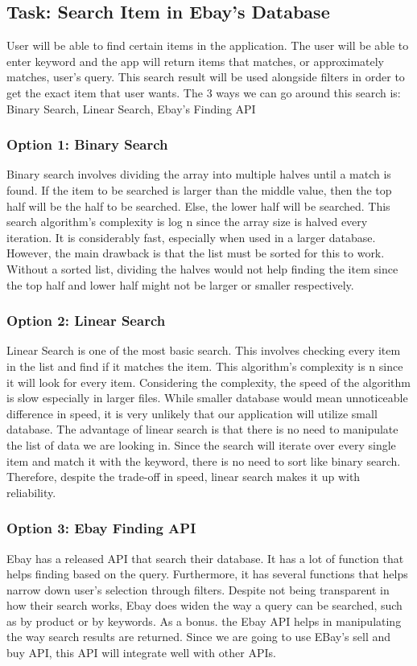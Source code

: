\documentclass[journal,compsoc, 10pt, draftclsnofoot, onecolumn]{IEEEtran}
\begin{document}
\subsection{Task: Search Item in Ebay's Database}
User will be able to find certain items in the application. The user will be able to enter keyword and the app will return items that matches, or approximately matches, user’s query. This search result will be used alongside filters in order to get the exact item that user wants. 
The 3 ways we can go around this search is: Binary Search, Linear Search, Ebay’s Finding API

\subsubsection{Option 1: Binary Search}
Binary search involves dividing the array into multiple halves until a match is found. If the item to be searched is larger than the middle value, then the top half will be the half to be searched. Else, the lower half will be searched. This search algorithm’s complexity is log n since the array size is halved every iteration. It is considerably fast, especially when used in a larger database. However, the main drawback is that the list must be sorted for this to work. Without a sorted list, dividing the halves would not help finding the item since the top half and lower half might not be larger or smaller respectively. 

\subsubsection{Option 2: Linear Search}
Linear Search is one of the most basic search. This involves checking every item in the list and find if it matches the item. This algorithm’s complexity is n since it will look for every item. Considering the complexity, the speed of the algorithm is slow especially in larger files. While smaller database would mean unnoticeable difference in speed, it is very unlikely that our application will utilize small database. The advantage of linear search is that there is no need to manipulate the list of data we are looking in. Since the search will iterate over every single item and match it with the keyword, there is no need to sort like binary search. Therefore, despite the trade-off in speed, linear search makes it up with reliability.

\subsubsection{Option 3: Ebay Finding API}
Ebay has a released API that search their database. It has a lot of function that helps finding based on the query. Furthermore, it has several functions that helps narrow down user’s selection through filters. Despite not being transparent in how their search works, Ebay does widen the way a query can be searched, such as by product or by keywords. As a bonus.  the Ebay API helps in manipulating the way search results are returned. Since we are going to use EBay’s sell and buy API, this API will integrate well with other APIs.  
\end{document}
